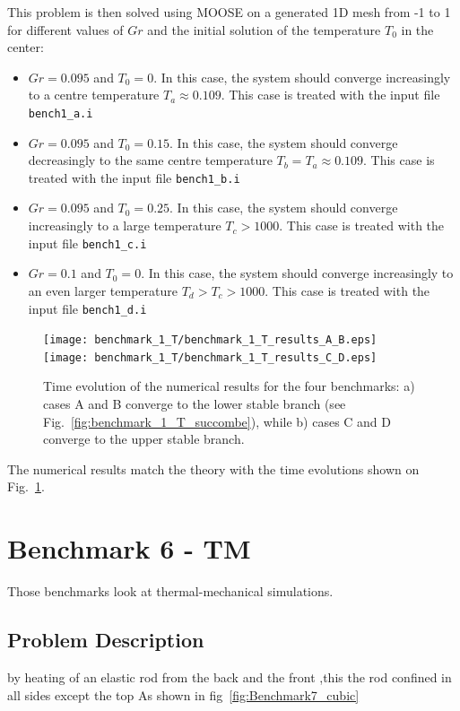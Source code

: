\documentclass[]{scrreprt}
\newcommand{\moose}{{MOOSE}}
\begin{document}
This problem is then solved using \moose{} on a generated 1D mesh from -1 to 1 for different values of $Gr$ and the initial solution of the temperature $T_0$ in the center:
\begin{itemize}
\item $Gr=0.095$ and $T_0=0$. In this case, the system should converge increasingly to a centre temperature $T_a\approx0.109$. This case is treated with the input file \texttt{bench1\_a.i} 
\item $Gr=0.095$ and $T_0=0.15$. In this case, the system should converge decreasingly to the same centre temperature $T_b=T_a\approx0.109$. This case is treated with the input file \texttt{bench1\_b.i} 
\item $Gr=0.095$ and $T_0=0.25$. In this case, the system should converge increasingly to a large temperature $T_c>1000$. This case is treated with the input file \texttt{bench1\_c.i} 
\item $Gr=0.1$ and $T_0=0$. In this case, the system should converge increasingly to an even larger temperature $T_d>T_c>1000$. This case is treated with the input file \texttt{bench1\_d.i} 
\end{itemize}

\begin{figure}
  \centering
  \texttt{[image: benchmark\_1\_T/benchmark\_1\_T\_results\_A\_B.eps]}
  \texttt{[image: benchmark\_1\_T/benchmark\_1\_T\_results\_C\_D.eps]}
  \caption{Time evolution of the numerical results for the four benchmarks: a) cases A and B converge to the lower stable branch (see Fig.~\ref{fig:benchmark_1_T_succombe}), while b) cases C and D converge to the upper stable branch.}
  \label{fig:benchmark_1_T_results}
\end{figure}

The numerical results match the theory with the time evolutions shown on Fig.~\ref{fig:benchmark_1_T_results}.

\section{Benchmark 6 - TM}
Those benchmarks look at thermal-mechanical simulations.
\subsection{Problem Description}
by heating of an elastic rod from the back and the front ,this the rod  confined in all sides except  the top As shown in fig~\ref{fig:Benchmark7_cubic}
\end{document}
